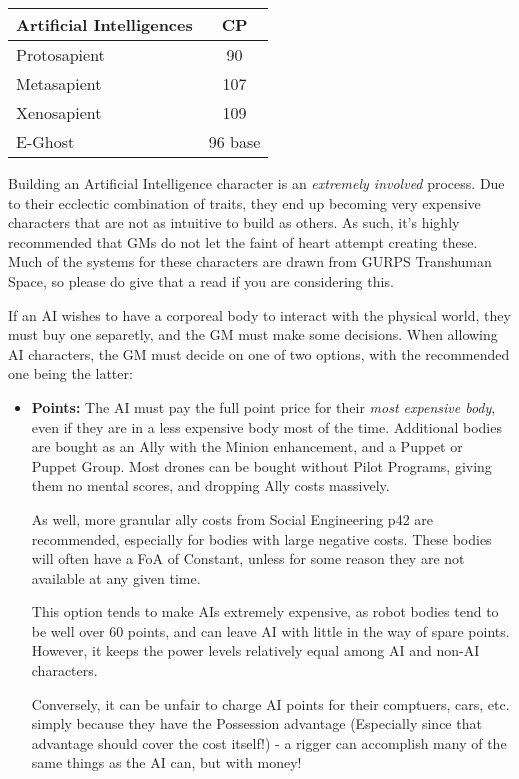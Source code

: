 \begin{multicols*}{3}
	\begin{center}
		\begin{tabularx}{0.32\textwidth}{|X|c|}
			\hline
			Artificial Intelligences & CP \\
			\hline
			\hline
			Protosapient & 90\\
			Metasapient & 107\\
			Xenosapient & 109 \\
			E-Ghost & 96 base\\
			\hline
		\end{tabularx}
	\end{center}
	
	Building an Artificial Intelligence character is an \textit{extremely involved} process. Due to their ecclectic combination of traits, they end up becoming very expensive characters that are not as intuitive to build as others. As such, it's highly recommended that GMs do not let the faint of heart attempt creating these. Much of the systems for these characters are drawn from GURPS Transhuman Space, so please do give that a read if you are considering this.
	
	If an AI wishes to have a corporeal body to interact with the physical world, they must buy one separetly, and the GM must make some decisions. When allowing AI characters, the GM must decide on one of two options, with the recommended one being the latter:
	\begin{itemize}
		\item \textbf{Points: } The AI must pay the full point price for their \textit{most expensive body}, even if they are in a less expensive body most of the time. Additional bodies are bought as an Ally with the Minion enhancement, and a Puppet or Puppet Group. Most drones can be bought without Pilot Programs, giving them no mental scores, and dropping Ally costs massively. 
		
		As well, more granular ally costs from Social Engineering p42 are recommended, especially for bodies with large negative costs. These bodies will often have a FoA of Constant, unless for some reason they are not available at any given time. 
		
		This option tends to make AIs extremely expensive, as robot bodies tend to be well over 60 points, and can leave AI with little in the way of spare points. However, it keeps the power levels relatively equal among AI and non-AI characters. 
		
		Conversely, it can be unfair to charge AI points for their comptuers, cars, etc. simply because they have the Possession advantage (Especially since that advantage should cover the cost itself!) - a rigger can accomplish many of the same things as the AI can, but with money!
		

\end{itemize}
\end{multicols*}

